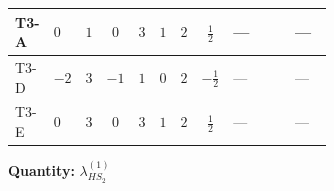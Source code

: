 \documentclass[8pt]{article}
\begin{document}
\begin{landscape}
\begin{longtable}{@{}llcccccc >{\raggedright\arraybackslash}p{0.21\linewidth} >{\raggedright\arraybackslash}p{0.21\linewidth} >{\raggedright\arraybackslash}p{0.21\linewidth}@{}}
\midrule
T3-A & $0$ & $1$ & $0$ & $3$ & $1$ & $2$ & $\frac{1}{2}$ & --- & \scriptsize\adjustbox{max width=\linewidth}{$\begin{gathered} +4 {\lambda_5} \left({\lambda_5}\right)^{*}\end{gathered}$} & --- \\
\midrule
T3-D & $-2$ & $3$ & $-1$ & $1$ & $0$ & $2$ & $-\frac{1}{2}$ & --- & \scriptsize\adjustbox{max width=\linewidth}{$\begin{gathered} +12 {\lambda_5} \left({\lambda_5}\right)^{*}\end{gathered}$} & --- \\
\midrule
T3-E & $0$ & $3$ & $0$ & $3$ & $1$ & $2$ & $\frac{1}{2}$ & --- & \scriptsize\adjustbox{max width=\linewidth}{$\begin{gathered} +4 {\lambda_5} \left({\lambda_5}\right)^{*}\end{gathered}$} & --- \\
\midrule
\bottomrule
\end{longtable}
\clearpage
\noindent\textbf{Quantity: }$\lambda_{HS_2}^{(1)}$\par\smallskip

\end{landscape}
\end{document}
